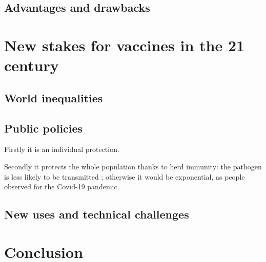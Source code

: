 \documentclass{article}
\begin{document}
        \subsection{Advantages and drawbacks}

    \section{New stakes for vaccines in the 21 century}

        \subsection{World inequalities}

        \subsection{Public policies}

            Firstly it is an individual protection.

            Secondly it protects the whole population thanks to herd immunity: the pathogen is less likely to be transmitted ; otherwise it would be exponential,
                as people observed for the Covid-19 pandemic.



        \subsection{New uses and technical challenges}


    \section{Conclusion}
\end{document}
